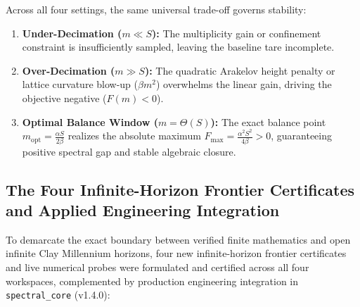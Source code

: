 \documentclass[11pt,a4paper]{article}
\begin{document}
Across all four settings, the same universal trade-off governs stability:
\begin{enumerate}
  \item \textbf{Under-Decimation ($m \ll S$):} The multiplicity gain or confinement constraint is insufficiently sampled, leaving the baseline tare incomplete.
  \item \textbf{Over-Decimation ($m \gg S$):} The quadratic Arakelov height penalty or lattice curvature blow-up ($\beta m^2$) overwhelms the linear gain, driving the objective negative ($F(m) < 0$).
  \item \textbf{Optimal Balance Window ($m = \Theta(S)$):} The exact balance point $m_{\mathrm{opt}} = \frac{\alpha S}{2\beta}$ realizes the absolute maximum $F_{\max} = \frac{\alpha^2 S^2}{4\beta} > 0$, guaranteeing positive spectral gap and stable algebraic closure.
\end{enumerate}

\subsection{The Four Infinite-Horizon Frontier Certificates and Applied Engineering Integration}

To demarcate the exact boundary between verified finite mathematics and open infinite Clay Millennium horizons, four new infinite-horizon frontier certificates and live numerical probes were formulated and certified across all four workspaces, complemented by production engineering integration in \texttt{spectral\_core} (v1.4.0):
\end{document}
